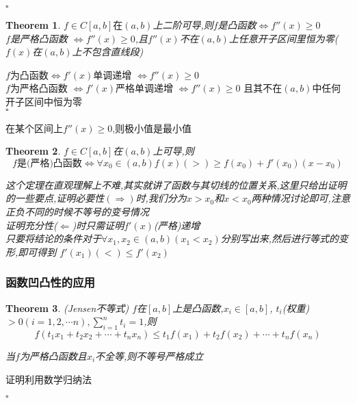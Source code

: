 \documentclass[11pt,hyperref,a4paper,UTF8]{ctexart}
\newtheorem{theorem}{Theorem}[subsection]
\newenvironment{cproof}{%
\heiti{证明}\kaishu
}{%
  \hfill $\square$
  \par\bigskip
}
\begin{document}
\begin{CJK}{UTF8}{gkai}
\begin{cproof}
\end{cproof}

\begin{theorem}
$f\in C[a,b]在(a,b)$上二阶可导,则$f$是凸函数$\Leftrightarrow f''(x) \geq 0$\\
$f$是严格凸函数 $\Leftrightarrow f''(x) \geq 0$,且$f''(x)$不在$(a,b)$上任意开子区间里恒为零($f(x)$在$(a,b)$上不包含直线段)
\end{theorem}
\begin{cproof}
$f$为凸函数$\Leftrightarrow f'(x)$单调递增 $\Leftrightarrow f''(x) \geq 0$\\

$f$为严格凸函数 $\Leftrightarrow f'(x)$严格单调递增 $\Leftrightarrow f''(x) \geq 0$ 且其不在$(a,b)$中任何开子区间中恒为零\\
\end{cproof}
在某个区间上$f''(x)\geq 0$,则极小值是最小值\\

\begin{theorem}
$f\in C[a,b]$在$(a,b)$上可导,则\\
\[f\text{是(严格)凸函数}\Leftrightarrow \forall x_0 \in (a,b) f(x) (>)\geq f(x_0) + f'(x_0) (x-x_0)\]

这个定理在直观理解上不难,其实就讲了函数与其切线的位置关系,这里只给出证明的一些要点,证明必要性$(\Rightarrow)$时,我们分为$x > x_0$和$x < x_0$两种情况讨论即可,注意正负不同的时候不等号的变号情况\\

证明充分性($\Leftarrow$)时只需证明$f'(x)$(严格)递增\\

只要将结论的条件对于$\forall x_1,x_2\in(a,b)(x_1<x_2)$分别写出来,然后进行等式的变形,即可得到 $f'(x_1) (<)\leq f'(x_2)$\\
\end{theorem}

\subsubsection{函数凹凸性的应用}

\begin{theorem}(Jensen不等式)
$f$在$[a,b]$上是凸函数,$x_i \in [a,b]$, $t_i$(权重) $> 0(i = 1,2,\cdots n) ,\sum_{i = 1} ^{n} t_i = 1$,则\\
\[f(t_1 x_1 + t_2 x_2 + \cdots + t_n x_n) \leq t_1f(x_1) + t_2 f(x_2) + \cdots + t_n f(x_n)\]

当$f$为严格凸函数且$x_i$不全等,则不等号严格成立\\
\end{theorem}
\begin{cproof}
证明利用数学归纳法


\end{cproof}
\end{CJK}
\end{document}
